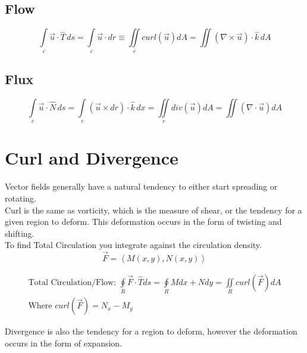 \documentclass{article}
\newcommand{\nvec}[1]{\left\langle #1 \right\rangle}
\begin{document}
    \subsection{Flow}
        \begin{equation}
        \int\limits_c \vec{u} \cdot \hat{T} \, ds = \int\limits_c \vec{u} \cdot dr \equiv \iint\limits_c curl(\vec{u}) dA = \iint \left( \nabla \times \vec{u} \right) \cdot \hat{k} \, dA
        \end{equation}

    \subsection{Flux}
        \begin{equation}
        \int\limits_c \vec{u} \cdot \hat{N} \, ds = \int\limits_c ( \vec{u} \times dr) \cdot \hat{k} \, dx = \iint\limits_c div(\vec{u}) dA = \iint (\nabla \cdot \vec{u}) dA
        \end{equation}

\section{Curl and Divergence}
Vector fields generally have a natural tendency to either start spreading or rotating.\\

Curl is the same as vorticity, which is the measure of shear, or the tendency for a given region to deform. This deformation occurs in the form of twisting and shifting.\\

To find Total Circulation you integrate against the circulation density.\\

\begin{equation}
\vec{F}=\nvec{M(x,y), N(x,y)}
\end{equation}

\begin{equation}
\begin{aligned}
\text{Total Circulation/Flow: } \oint\limits_R \vec{F} \cdot \hat{T} ds = \oint\limits_R Mdx + Ndy = \iint\limits_R curl(\vec{F})dA \\
\text{Where } curl(\vec{F})=N_x - M_y
\end{aligned}
\end{equation}

Divergence is also the tendency for a region to deform, however the deformation occurs in the form of expansion.\\
\end{document}
